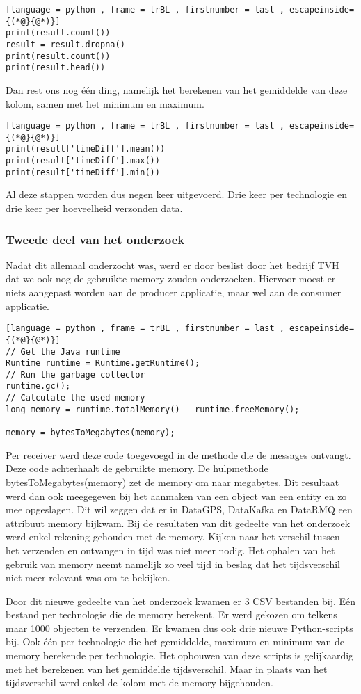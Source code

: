 \begin{lstlisting}[language = python , frame = trBL , firstnumber = last , escapeinside={(*@}{@*)}]
print(result.count())
result = result.dropna()
print(result.count())
print(result.head())
\end{lstlisting}

Dan rest ons nog één ding, namelijk het berekenen van het gemiddelde van deze kolom, samen met het minimum en maximum.
\begin{lstlisting}[language = python , frame = trBL , firstnumber = last , escapeinside={(*@}{@*)}]
print(result['timeDiff'].mean())
print(result['timeDiff'].max())
print(result['timeDiff'].min())
\end{lstlisting}
Al deze stappen worden dus negen keer uitgevoerd. Drie keer per technologie en drie keer per hoeveelheid verzonden data.

\subsubsection{Tweede deel van het onderzoek}
Nadat dit allemaal onderzocht was, werd er door beslist door het bedrijf TVH dat we ook nog de gebruikte memory zouden onderzoeken. Hiervoor moest er niets aangepast worden aan de producer applicatie, maar wel aan de consumer applicatie. 

\begin{lstlisting}[language = python , frame = trBL , firstnumber = last , escapeinside={(*@}{@*)}]
// Get the Java runtime
Runtime runtime = Runtime.getRuntime();
// Run the garbage collector
runtime.gc();
// Calculate the used memory
long memory = runtime.totalMemory() - runtime.freeMemory();

memory = bytesToMegabytes(memory);
\end{lstlisting}
Per receiver werd deze code toegevoegd in de methode die de messages ontvangt. Deze code achterhaalt de gebruikte memory. De hulpmethode bytesToMegabytes(memory) zet de memory om naar megabytes. Dit resultaat werd dan ook meegegeven bij het aanmaken van een object van een entity en zo mee opgeslagen. Dit wil zeggen dat er in DataGPS, DataKafka en DataRMQ een attribuut memory bijkwam. Bij de resultaten van dit gedeelte van het onderzoek werd enkel rekening gehouden met de memory. Kijken naar het verschil tussen het verzenden en ontvangen in tijd was niet meer nodig. Het ophalen van het gebruik van memory neemt namelijk zo veel tijd in beslag dat het tijdsverschil niet meer relevant was om te bekijken.

Door dit nieuwe gedeelte van het onderzoek kwamen er 3 CSV bestanden bij. Eén bestand per technologie die de memory berekent. Er werd gekozen om telkens maar 1000 objecten te verzenden. Er kwamen dus ook drie nieuwe Python-scripts bij. Ook één per technologie die het gemiddelde, maximum en minimum van de memory berekende per technologie. Het opbouwen van deze scripts is gelijkaardig met het berekenen van het gemiddelde tijdsverschil. Maar in plaats van het tijdsverschil werd enkel de kolom met de memory bijgehouden.  